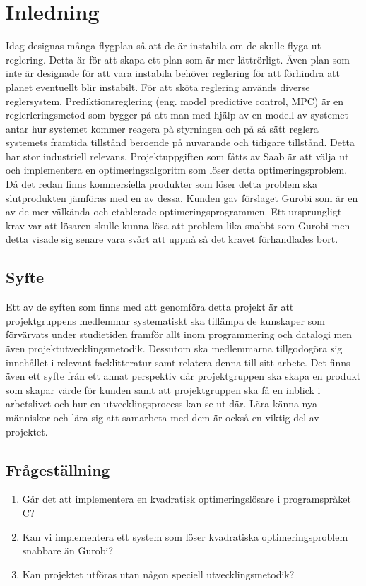 \section{Inledning}
Idag designas många flygplan så att de är instabila om de skulle flyga ut reglering. Detta är för att skapa ett plan som är mer lättrörligt. Även plan som inte är designade för att vara instabila behöver reglering för att förhindra att planet eventuellt blir instabilt. För att sköta reglering används diverse reglersystem. \citep{airplanestability}
\newline
\newline
Prediktionsreglering (eng. model predictive control, MPC) är en reglerleringsmetod som 
bygger på att man med hjälp av en modell av systemet antar hur systemet kommer reagera på styrningen och på så sätt reglera systemets framtida tillstånd beroende på nuvarande och tidigare tillstånd. Detta har stor industriell relevans.\citep[2]{ir}
\newline
\newline
Projektuppgiften som fåtts av Saab är att välja ut och implementera en optimeringsalgoritm som löser detta optimeringsproblem. Då det redan finns kommersiella produkter som löser detta problem ska slutprodukten jämföras med en av dessa. Kunden gav förslaget Gurobi som är en av de mer välkända och etablerade optimeringsprogrammen. Ett ursprungligt krav var att lösaren skulle kunna lösa att problem lika snabbt som Gurobi men detta visade sig senare vara svårt att uppnå så det kravet förhandlades bort. 

\subsection{Syfte}
Ett av de syften som finns med att genomföra detta projekt är att projektgruppens medlemmar systematiskt ska tillämpa de kunskaper som förvärvats under studietiden framför allt inom programmering och datalogi men även projektutvecklingsmetodik. Dessutom ska medlemmarna tillgodogöra sig innehållet i relevant facklitteratur samt relatera denna till sitt arbete. 
Det finns även ett syfte från ett annat perspektiv där projektgruppen ska skapa en produkt som skapar värde för kunden samt att projektgruppen ska få en inblick i arbetslivet och hur en utvecklingsprocess kan se ut där. Lära känna nya människor och lära sig att samarbeta med dem är också en viktig del av projektet. 

\subsection{Frågeställning}
	\begin{enumerate}
		\item Går det att implementera en kvadratisk optimeringslösare i programspråket C?
		\item Kan vi implementera ett system som löser kvadratiska optimeringsproblem snabbare än Gurobi?
		\item Kan projektet utföras utan någon speciell utvecklingsmetodik? 
	\end{enumerate}

